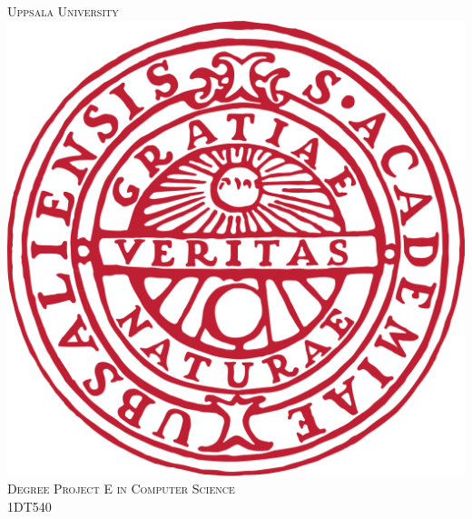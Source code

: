 \documentclass[12pt]{article}
\begin{document}
\begin{titlepage}

    \newcommand{\HRule}{\rule{\linewidth}{0.5mm}} %

    \center %


    \textsc{\LARGE Uppsala University}\\[1.5cm] %
    \includegraphics[scale=.1]{figures/Uppsala_University_seal_svg.png}\\[1cm] %
    \textsc{\Large Degree Project E in Computer Science}\\[0.5cm] %
    \textsc{\large 1DT540}\\[0.5cm] %



\end{titlepage}
\end{document}
